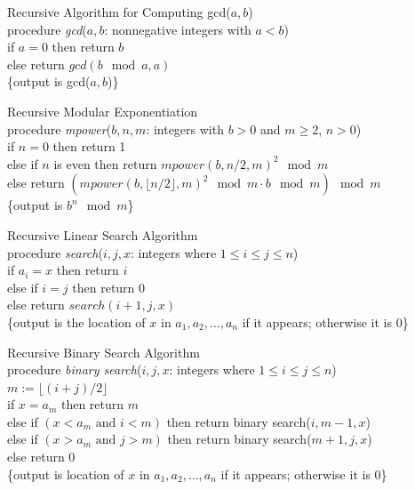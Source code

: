 \documentclass[12pt]{article}
\begin{document}
\begin{alg} Recursive Algorithm for Computing gcd($a, b$) \\ 
procedure \textit{gcd}($a, b$: nonnegative integers with $a < b$) \\ 
if $a = 0$ then return $b$ \\ 
else return $gcd(b \mod a, a)$ \\ \{output is gcd($a, b$)\} \end{alg}
\begin{alg} Recursive Modular Exponentiation \\ 
procedure \textit{mpower}($b, n, m$: integers with $b > 0$ and $m \geq 2$, $n > 0$) \\
if $n = 0$ then return 1 \\
else if $n$ is even then return $mpower(b, n/2, m)^2 \mod m $ \\ 
else return $(mpower(b, \lfloor n/2 \rfloor, m)^2 \mod m \cdot b \mod m) \mod m $ \\ \{output is $b^n \mod m$\} \end{alg} 
\begin{alg} Recursive Linear Search Algorithm \\
procedure \textit{search}($i, j, x$: integers where $1 \leq i \leq j \leq n$) \\ 
if $a_i = x$ then return $i$ \\ 
else if $i = j$ then return 0 \\
else return $search(i + 1, j, x)$ \\ \{output is the location of $x$ in $a_1, a_2, \dots, a_n$ if it appears; otherwise it is 0\} \end{alg} 
\begin{alg} Recursive Binary Search Algorithm \\
procedure \textit{binary search}($i, j, x$: integers where $1 \leq i \leq j \leq n$) \\ 
$m:= \lfloor (i + j)/2 \rfloor$ \\ 
if $x = a_m$ then return $m$ \\ 
else if $(x < a_m \text{ and } i < m)$ then return binary search($i, m - 1, x$) \\ 
else if $(x > a_m \text{ and } j > m)$ then return binary search($m + 1, j, x$) \\ 
else return 0 \\ \{output is location of $x$ in $a_1, a_2, \dots, a_n$ if it appears; otherwise it is 0\} \end{alg} 
\end{document}
